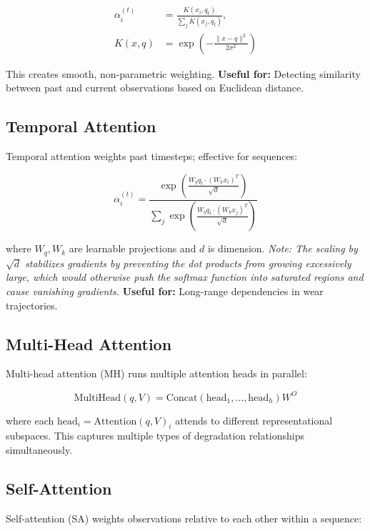 \documentclass[11pt]{article}
\begin{document}
\begin{equation}
\begin{aligned}
\alpha_i^{(t)} &= \frac{K(x_i, q_t)}{\sum_j K(x_j, q_t)},\\
K(x, q) &= \exp\left( - \frac{\lVert x - q \rVert^2}{2\sigma^2} \right)
\end{aligned}
\end{equation}

This creates smooth, non-parametric weighting.
\textbf{Useful for:} Detecting similarity between past and current observations based on Euclidean distance.

\subsection{Temporal Attention}
Temporal attention weights past timesteps; effective for sequences:

\begin{equation}
\alpha_i^{(t)} = \frac{\exp\left( \frac{W_q q_t \cdot (W_k x_i)^T}{\sqrt{d}} \right)}{\sum_j \exp\left( \frac{W_q q_t \cdot (W_k x_j)^T}{\sqrt{d}} \right)}
\end{equation}

where $W_q, W_k$ are learnable projections and $d$ is dimension. \textit{Note: The scaling by $\sqrt{d}$ stabilizes gradients by preventing the dot products from growing excessively large, which would otherwise push the softmax function into saturated regions and cause vanishing gradients.}
\textbf{Useful for:} Long-range dependencies in wear trajectories.

\subsection{Multi-Head Attention}
Multi-head attention (MH) runs multiple attention heads in parallel:

\begin{equation}
\mathrm{MultiHead}(q, V) = \mathrm{Concat}(\mathrm{head}_1, \ldots, \mathrm{head}_h)W^O
\end{equation}

where each $\mathrm{head}_i = \mathrm{Attention}(q, V)_i$ attends to different representational subspaces. This captures multiple types of degradation relationships simultaneously.

\subsection{Self-Attention}
Self-attention (SA) weights observations relative to each other within a sequence:
\end{document}
